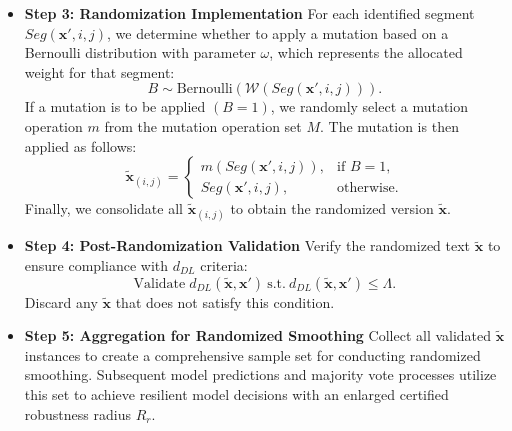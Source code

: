 \begin{itemize}[leftmargin=*]
\item \textbf{Step 3: Randomization Implementation}
For each identified segment $Seg(\mathbf{x}',i,j)$, we determine whether to apply a mutation based on a Bernoulli distribution with parameter $\omega$, which represents the allocated weight for that segment:
\begin{equation}
B \sim \text{Bernoulli}(\mathcal{W}(Seg(\mathbf{x}',i,j))).
\end{equation}
If a mutation is to be applied $(B = 1)$, we randomly select a mutation operation $m$ from the mutation operation set $M$. The mutation is then applied as follows:
\begin{equation}
    \tilde{\mathbf{x}}_{(i,j)} = \begin{cases}
        m(Seg(\mathbf{x}',i,j)), & \text{if } B=1, \\
        Seg(\mathbf{x}',i,j), & \text{otherwise}.
    \end{cases}    
\end{equation}
Finally, we consolidate all $\tilde{\mathbf{x}}_{(i,j)}$ to obtain the randomized version $\tilde{\mathbf{x}}$.

\item \textbf{Step 4: Post-Randomization Validation}
Verify the randomized text $\tilde{\mathbf{x}}$ to ensure compliance with $d_{DL}$ criteria:
\begin{equation}
    \text{Validate} \; d_{DL}(\tilde{\mathbf{x}}, \mathbf{x}')\ \text{s.t.}\ d_{DL}(\tilde{\mathbf{x}}, \mathbf{x}') \leq \Lambda.
\end{equation}
Discard any $\tilde{\mathbf{x}}$ that does not satisfy this condition.

\item \textbf{Step 5: Aggregation for Randomized Smoothing}
Collect all validated $\tilde{\mathbf{x}}$ instances to create a comprehensive sample set for conducting randomized smoothing. Subsequent model predictions and majority vote processes utilize this set to achieve resilient model decisions with an enlarged certified robustness radius $R_r$.
\end{itemize}
